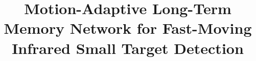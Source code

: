 \documentclass[twocolumn]{IEEEtran}
\begin{document}
\setlength{\abovedisplayskip}{.5\baselineskip} %
\setlength{\belowdisplayskip}{.5\baselineskip} %


\title{Motion-Adaptive Long-Term Memory Network for Fast-Moving Infrared Small Target Detection}




\maketitle











\end{document}
